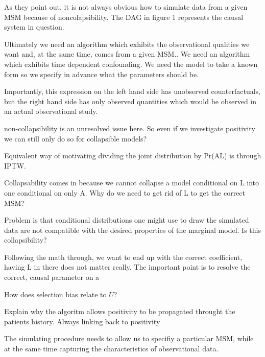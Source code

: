 \documentclass[11pt]{article}
\begin{document}
As they point out, it is not always obvious how to simulate data from a
given MSM because of noncolapsibility. The DAG in figure 1 represents
the causal system in question.

Ultimately we need an algorithm which exhibits the observational
qualities we want and, at the same time, comes from a given MSM.. We
need an algorithm which exhibits time dependent confounding. We need the
model to take a known form so we specify in advance what the parameters
should be.

Importantly, this expression on the left hand side has unobserved
counterfactuals, but the right hand side has only observed quantities
which would be observed in an actual observational study.

non-collapsibility is an unresolved issue here. So even if we
investigate positivity we can still only do so for collapsible models?

Equivalent way of motivating dividing the joint distribution by
Pr(A\textbar{}L) is through IPTW.

Collapsability comes in because we cannot collapse a model conditional
on L into one conditional on only A. Why do we need to get rid of L to
get the correct MSM?

Problem is that conditional distributions one might use to draw the
simulated data are not compatible with the desired properties of the
marginal model. Is this collapsibility?

Following the math through, we want to end up with the correct
coefficient, having L in there does not matter really. The important
point is to resolve the correct, causal parameter on a

How does selection bias relate to \(U\)?

Explain why the algoritm allows positivity to be propagated throught the
patients history. Always linking back to positivity

The simulating procedure needs to allow us to specifiy a particular MSM,
while at the same time capturing the characteristics of observational
data.
\end{document}
